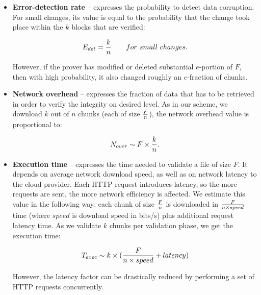 \begin{itemize}

\item \textbf{Error-detection rate} -- expresses the probability to detect data
corruption. For small changes, its value is equal to the probability that the
change took place within the $k$ blocks that are verified:

\begin{equation}
	E_{det} = {k \over n} \hspace{0.6cm} \ for\ small\ changes.
\end{equation}

However, if the prover has modified or deleted substantial $e$-portion of $F$,
then with high probability, it also changed roughly an $e$-fraction of
chunks.

\item \textbf{Network overhead} -- expresses the fraction of data that has to
be retrieved in order to verify the integrity on desired level. As in our
scheme, we download $k$ out of $n$ chunks (each of size $F \over n$), the
network overhead value is proportional to:

\begin{equation}
	N_{over} \sim F \times {k \over n}.
\end{equation}

\item \textbf {Execution time} -- expresses the time needed to validate a file
of size $F$. It depends on average network download speed, as well as on
network latency to the cloud provider. Each HTTP request introduces latency, so
the more requests are sent, the more network efficiency is affected. We
estimate this value in the following way: each chunk
of size $F \over n$ is downloaded in $F \over {n \times speed}$ time (where
$speed$ is download speed in bits/s) plus additional request latency time. As
we validate $k$ chunks per validation phase, we get the execution time: 

\begin{equation}
	T_{exec} \sim k \times ({F \over {n \times speed}} + latency) 
\end{equation}

However, the latency factor can be drastically reduced by performing a set of
HTTP requests concurrently.

\end{itemize}

